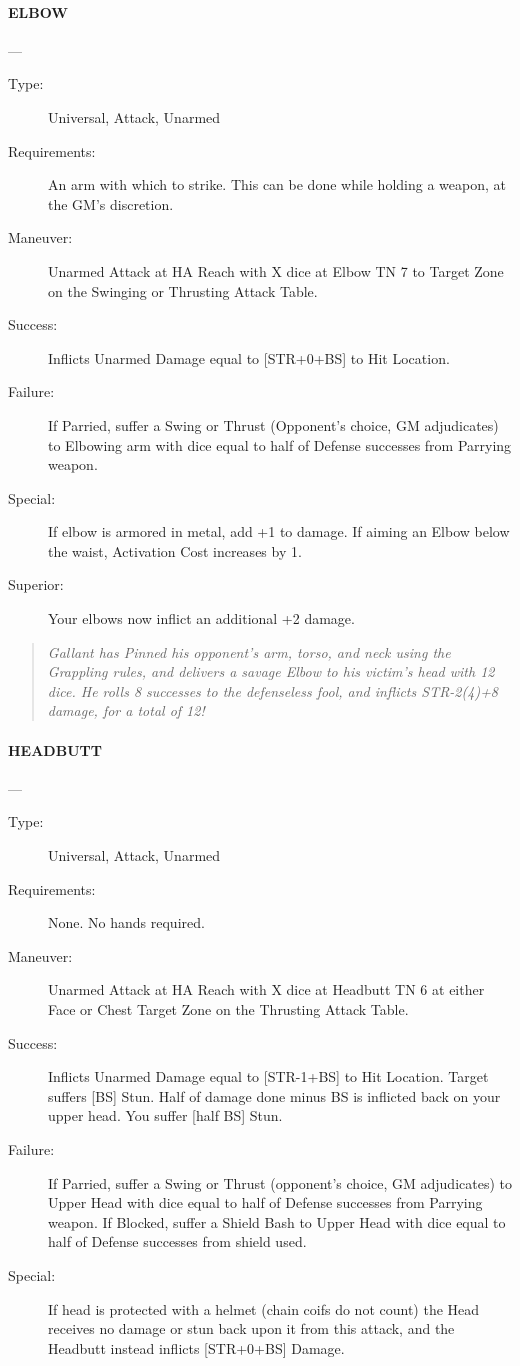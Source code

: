 \documentclass[oneside,11pt,english]{book}
\begin{document}
\paragraph{\large\label{man:ELBOW} ELBOW}---\quad{\large[X]}
\vspace{-10pt}\begin{description} 
\item [Type:] Universal, Attack, Unarmed 
\item [Requirements:] An arm with which to strike. This can be done while holding a weapon, at the GM's 
discretion. 
\item [Maneuver:] Unarmed Attack at HA Reach with X dice at Elbow TN 7 to Target Zone on the Swinging or 
Thrusting Attack Table. 
\item [Success:] Inflicts Unarmed Damage equal to [STR+0+BS] to Hit Location. 
\item [Failure:] If Parried, suffer a Swing or Thrust (Opponent’s choice, GM adjudicates) to Elbowing arm with 
dice equal to half of Defense successes from Parrying weapon. 
\item [Special:] If elbow is armored in metal, add +1 to damage. 
If aiming an Elbow below the waist, Activation Cost increases by 1. 
\item [Superior:] Your elbows now inflict an additional +2 damage. 
\end{description}
\begin{quotation}
\emph{Gallant has Pinned his opponent’s arm, torso, and neck using the Grappling rules, and delivers a savage Elbow to his victim’s 
head with 12 dice. He rolls 8 successes to the defenseless fool, and inflicts STR-2(4)+8 damage, for a total of 12! }
\end{quotation}

\paragraph{\large\label{man:HEADBUTT} HEADBUTT}---\quad{\large[X+1]}
\vspace{-10pt}\begin{description} 
\item [Type:] Universal, Attack, Unarmed 
\item [Requirements:] None. No hands required. 
\item [Maneuver:] Unarmed Attack at HA Reach with X dice at Headbutt TN 6 at either Face or Chest Target 
Zone on the Thrusting Attack Table. 
\item [Success:] Inflicts Unarmed Damage equal to [STR-1+BS] to Hit Location. Target suffers [BS] Stun. Half 
of damage done minus BS is inflicted back on your upper head. You suffer [half BS] Stun. 
\item [Failure:] If Parried, suffer a Swing or Thrust (opponent’s choice, GM adjudicates) to Upper Head with 
dice equal to half of Defense successes from Parrying weapon. If Blocked, suffer a Shield Bash to Upper 
Head with dice equal to half of Defense successes from shield used. 
\item [Special:] If head is protected with a helmet (chain coifs do not count) the Head receives no damage or stun 
back upon it from this attack, and the Headbutt instead inflicts [STR+0+BS] Damage. 
\end{description}
\end{document}
